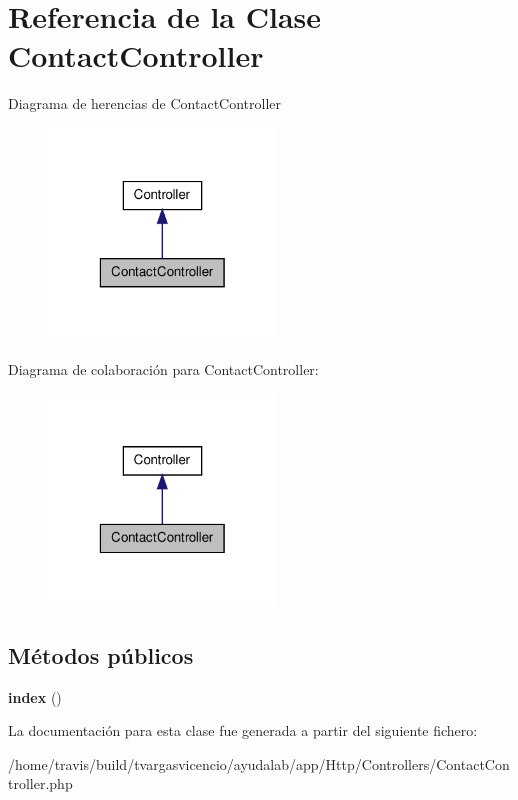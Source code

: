 \hypertarget{class_app_1_1_http_1_1_controllers_1_1_contact_controller}{\section{\-Referencia de la \-Clase \-Contact\-Controller}
\label{class_app_1_1_http_1_1_controllers_1_1_contact_controller}
}


\-Diagrama de herencias de \-Contact\-Controller
\nopagebreak
\begin{figure}[H]
\begin{center}
\leavevmode
\includegraphics[width=172pt]{class_app_1_1_http_1_1_controllers_1_1_contact_controller__inherit__graph}
\end{center}
\end{figure}


\-Diagrama de colaboración para \-Contact\-Controller\-:
\nopagebreak
\begin{figure}[H]
\begin{center}
\leavevmode
\includegraphics[width=172pt]{class_app_1_1_http_1_1_controllers_1_1_contact_controller__coll__graph}
\end{center}
\end{figure}
\subsection*{\-Métodos públicos}
\begin{DoxyCompactItemize}
\item 
\hypertarget{class_app_1_1_http_1_1_controllers_1_1_contact_controller_a149eb92716c1084a935e04a8d95f7347}{{\bfseries index} ()}\label{class_app_1_1_http_1_1_controllers_1_1_contact_controller_a149eb92716c1084a935e04a8d95f7347}

\end{DoxyCompactItemize}


\-La documentación para esta clase fue generada a partir del siguiente fichero\-:\begin{DoxyCompactItemize}
\item 
/home/travis/build/tvargasvicencio/ayudalab/app/\-Http/\-Controllers/\-Contact\-Controller.\-php\end{DoxyCompactItemize}
